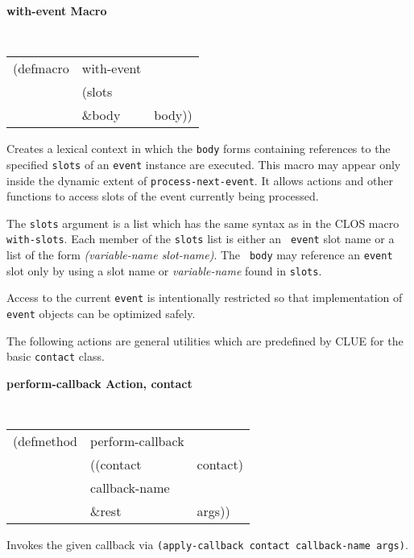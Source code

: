 \documentclass[twoside]{book}
\begin{document}
\begin{sloppy}
{\large {\bf with-event \hfill Macro}} 
\begin{flushright} \parbox[t]{6.125in}{
\tt
\begin{tabular}{lll}
\raggedright
(defmacro & with-event & \\ 
& (slots \\
&  \&body  & body))
\end{tabular}
\rm

}\end{flushright}

\begin{flushright} \parbox[t]{6.125in}{
Creates a lexical context in which the {\tt body} forms containing references to
the specified {\tt slots} of an {\tt event} instance are executed. This macro
may appear only inside the dynamic extent of {\tt process-next-event}.
It allows actions and other functions to access slots of the event
currently being processed.

The {\tt slots} argument is a list which has the same syntax as in the CLOS
macro {\tt with-slots}. Each member of the {\tt slots} list is either an {\tt
event} slot name or a list of the form {\em (variable-name slot-name)}. The {\tt
body} may reference an {\tt event} slot only by using a slot name or {\em
variable-name} found in {\tt slots}.

Access to the current {\tt event} is intentionally restricted so that
implementation of {\tt event} objects can be optimized safely.

}\end{flushright}



The following actions are general utilities which are predefined by CLUE
for the basic {\tt contact} class.

{\samepage
{\large {\bf perform-callback \hfill Action, contact}}
\begin{flushright} 
\parbox[t]{6.125in}{
\tt
\begin{tabular}{lll}
\raggedright
(defmethod & perform-callback & \\
& ((contact  &contact)\\
& callback-name\\
& \&rest & args))
\end{tabular}
\rm
}\end{flushright}}
\begin{flushright} 
\parbox[t]{6.125in}{
Invokes the given callback via {\tt (apply-callback contact
callback-name args)}. }
\end{flushright}


\end{sloppy}
\end{document}
